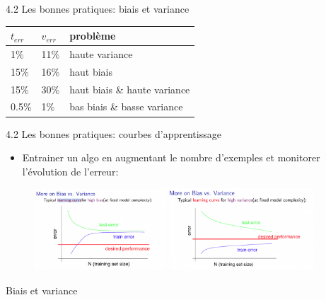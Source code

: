 \begin{frame}{4.2 Les bonnes pratiques: biais et variance}
\begin{minipage}{.39\textwidth}
\begin{center}
    \end{center}
  \end{minipage}
  \begin{minipage}{.59\textwidth}
    \begin{table}
      \begin{tabular}{l|l|l}
        $t_{err}$ & $v_{err}$ & problème \\
        \hline
        1$\%$ & 11$\%$ & haute variance \\
        15$\%$ & 16$\%$ & haut biais \\
        15$\%$ & 30$\%$ & haut biais \& haute variance \\
        0.5$\%$ & 1$\%$ & bas biais \& basse variance \\
      \end{tabular}
    \end{table}
  \end{minipage}
\end{frame}

\begin{frame}{4.2 Les bonnes pratiques: courbes d'apprentissage}
  \begin{itemize}
  \item Entrainer un algo en augmentant le nombre d'exemples et monitorer l'évolution de l'erreur:
  \end{itemize}
  \begin{figure}
    \includegraphics[trim = {0 0 0 32}, clip, width=0.44\textwidth]{fig/learningCurves1.png}
    \includegraphics[trim = {0 0 0 30}, clip, width=0.48\textwidth]{fig/learningCurves2.png}
  \end{figure}
  \vspace{-0.5cm}
  \begin{center}
    \scriptsize
    Biais et variance \href{https://www.coursera.org/learn/machine-learning}{\color{blue}{[Coursera]}}
  \end{center}  
\end{frame}

